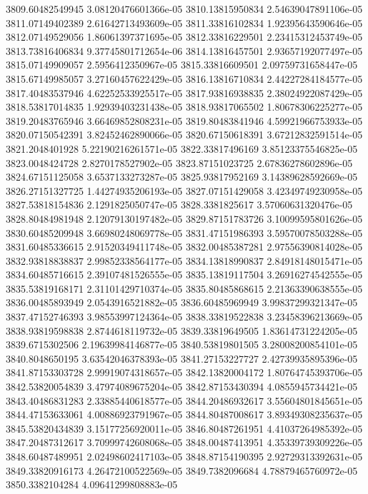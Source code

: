 {3809.60482549945 3.08120476601366e-05
3810.13815950834 2.54639047891106e-05
3811.07149402389 2.61642713493609e-05
3811.33816102834 1.92395643590646e-05
3812.07149529056 1.86061397371695e-05
3812.33816229501 2.23415312453749e-05
3813.73816406834 9.37745801712654e-06
3814.13816457501 2.93657192077497e-05
3815.07149909057 2.5956412350967e-05
3815.33816609501 2.09759731658447e-05
3815.67149985057 3.27160457622429e-05
3816.13816710834 2.44227284184577e-05
3817.40483537946 4.62252533925517e-05
3817.93816938835 2.38024922087429e-05
3818.53817014835 1.92939403231438e-05
3818.93817065502 1.80678306225277e-05
3819.20483765946 3.66469852808231e-05
3819.80483841946 4.59921966753933e-05
3820.07150542391 3.82452462890066e-05
3820.67150618391 3.67212832591514e-05
3821.2048401928 5.22190216261571e-05
3822.33817496169 3.85123375546825e-05
3823.0048424728 2.8270178527902e-05
3823.87151023725 2.67836278602896e-05
3824.67151125058 3.6537133273287e-05
3825.93817952169 3.14389628592669e-05
3826.27151327725 1.44274935206193e-05
3827.07151429058 3.42349749230958e-05
3827.53818154836 2.1291825050747e-05
3828.3381825617 3.57060631320476e-05
3828.80484981948 2.12079130197482e-05
3829.87151783726 3.10099595801626e-05
3830.60485209948 3.66980248069778e-05
3831.47151986393 3.59570078503288e-05
3831.60485336615 2.91520349411748e-05
3832.00485387281 2.97556390814028e-05
3832.93818838837 2.99852338564177e-05
3834.13818990837 2.84918148015471e-05
3834.60485716615 2.39107481526555e-05
3835.13819117504 3.26916274542555e-05
3835.53819168171 2.31101429710374e-05
3835.80485868615 2.21363390638555e-05
3836.00485893949 2.0543916521882e-05
3836.60485969949 3.99837299321347e-05
3837.47152746393 3.98553997124364e-05
3838.33819522838 3.23458396213669e-05
3838.93819598838 2.8744618119732e-05
3839.33819649505 1.83614731224205e-05
3839.6715302506 2.19639984146877e-05
3840.53819801505 3.28008200854101e-05
3840.8048650195 3.63542046378393e-05
3841.27153227727 2.42739935895396e-05
3841.87153303728 2.99919074318657e-05
3842.13820004172 1.80764745393706e-05
3842.53820054839 3.47974089675204e-05
3842.87153430394 4.0855945734421e-05
3843.40486831283 2.33885440618577e-05
3844.20486932617 3.55604801845651e-05
3844.47153633061 4.00886923791967e-05
3844.80487008617 3.89349308235637e-05
3845.53820434839 3.15177256920011e-05
3846.80487261951 4.41037264985392e-05
3847.20487312617 3.70999742608068e-05
3848.00487413951 4.35339739309226e-05
3848.60487489951 2.02498602417103e-05
3848.87154190395 2.92729313392631e-05
3849.33820916173 4.26472100522569e-05
3849.7382096684 4.78879465760972e-05
3850.3382104284 4.09641299808883e-05
}
